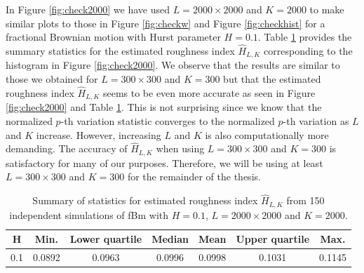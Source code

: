 \documentclass{article}
\begin{document}
In Figure \ref{fig:check2000} we have used $L=2000\times 2000$ and $K=2000$ to make similar plots to those in Figure \ref{fig:checkw} and Figure \ref{fig:checkhist} for a fractional Brownian motion with Hurst parameter $H=0.1$. Table \ref{tab:check2000} provides the summary statistics for the estimated roughness index $\hat{H}_{L,K}$ corresponding to the histogram in Figure \ref{fig:check2000}. We observe that the results are similar to those we obtained for $L=300\times 300$ and $K=300$ but that the estimated roughness index $\hat{H}_{L,K}$ seems to be even more accurate as seen in Figure \ref{fig:check2000} and Table \ref{tab:check2000}. This is not surprising since we know that the normalized $p$-th variation statistic converges to the normalized $p$-th variation as $L$ and $K$ increase. However, increasing $L$ and $K$ is also computationally more demanding. The accuracy of $\hat{H}_{L,K}$ when using $L=300\times 300$ and $K=300$ is satisfactory for many of our purposes. Therefore, we will be using at least $L=300\times 300$ and $K=300$ for the remainder of the thesis.
\begin{table}[htbp]
    \centering
    \begin{tabular}{ccccccc}
        \toprule
        H & Min. & Lower quartile & Median & Mean & Upper quartile & Max. \\
        \midrule
        0.1 & 0.0892 & 0.0963 & 0.0996 & 0.0998 & 0.1031 & 0.1145 \\
        \bottomrule
    \end{tabular}
    \caption{Summary of statistics for estimated roughness index $\hat{H}_{L,K}$ from 150 independent simulations of fBm with $H=0.1$, $L=2000\times 2000$ and $K=2000$.}
    \label{tab:check2000}
\end{table}
\end{document}
